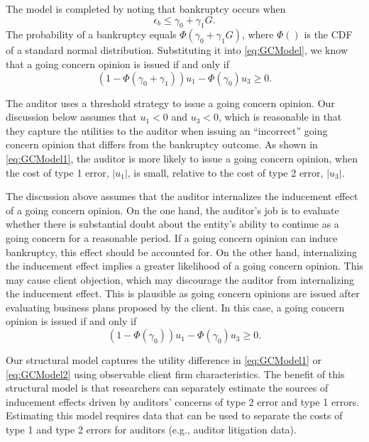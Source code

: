 \documentclass[aoas,preprint, 11pt, dvipsnames, table, x11name]{imsart}
\theoremstyle{remark}
\begin{document}
\begin{enumerate}
	The model is completed by noting that bankruptcy occurs when
	\begin{equation}
		\epsilon_b \leq \gamma_0 + \gamma_1 G.
	\end{equation}
	The probability of a bankruptcy equals $\Phi(\gamma_{0} + \gamma_{1} G)$, where $\Phi()$ is the CDF of a standard normal distribution. Substituting it into \autoref{eq:GCModel}, we know that a going concern opinion is issued if and only if
	\begin{equation}
		(1- \Phi(\gamma_0 + \gamma_1)) u_{1}  -  \Phi(\gamma_0)u_{3} \geq 0. \label{eq:GCModel1}
	\end{equation}
	
	The auditor uses a threshold strategy to issue a going concern opinion. Our discussion below assumes that $u_1<0$ and $u_3<0$, which is reasonable in that they capture the utilities to the auditor when issuing an ``incorrect'' going concern opinion that differs from the bankruptcy outcome. As shown in \autoref{eq:GCModel1}, the auditor is more likely to issue a going concern opinion, when the cost of type 1 error, $|u_{1}|$, is small, relative to the cost of type 2 error, $|u_{3}|$. 
	
	The discussion above assumes that the auditor internalizes the inducement effect of a going concern opinion. On the one hand, the auditor's job is to evaluate whether there is substantial doubt about the entity's ability to continue as a going concern for a reasonable period. If a going concern opinion can induce bankruptcy, this effect should be accounted for. On the other hand, internalizing the inducement effect implies a greater likelihood of a going concern opinion. This may cause client objection, which may discourage the auditor from internalizing the inducement effect. This is plausible as going concern opinions are issued after evaluating business plans proposed by the client. In this case, a going concern opinion is issued if and only if 
	\begin{equation}
		(1- \Phi(\gamma_0)) u_{1}  -  \Phi(\gamma_0)u_{3}  \geq 0. \label{eq:GCModel2}
	\end{equation}
	
	Our structural model captures the utility difference in \autoref{eq:GCModel1} or \autoref{eq:GCModel2} using observable client firm characteristics. The benefit of this structural model is that researchers can separately estimate the sources of inducement effects driven by auditors' concerns of type 2 error and type 1 errors. Estimating this model requires data that can be used to separate the costs of type 1 and type 2 errors for auditors (e.g., auditor litigation data). 
	
	
	
\end{enumerate}	
	
\end{document}
